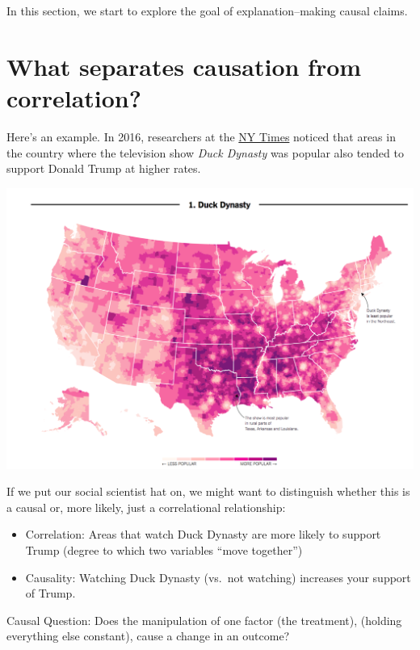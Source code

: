\documentclass[
  letterpaper,
  DIV=11,
  numbers=noendperiod]{scrreprt}
\providecommand{\tightlist}{%
  \setlength{\itemsep}{0pt}\setlength{\parskip}{0pt}}\usepackage{longtable,booktabs,array}
\begin{document}
In this section, we start to explore the goal of explanation--making
causal claims.

\hypertarget{what-separates-causation-from-correlation}{%
\section{What separates causation from
correlation?}\label{what-separates-causation-from-correlation}}

Here's an example. In 2016, researchers at the
\href{https://www.nytimes.com/interactive/2016/12/26/upshot/duck-dynasty-vs-modern-family-television-maps.html}{NY
Times} noticed that areas in the country where the television show
\emph{Duck Dynasty} was popular also tended to support Donald Trump at
higher rates.

\includegraphics{images/duckdynasty.png}

If we put our social scientist hat on, we might want to distinguish
whether this is a causal or, more likely, just a correlational
relationship:

\begin{itemize}
\tightlist
\item
  Correlation: Areas that watch Duck Dynasty are more likely to support
  Trump (degree to which two variables ``move together'')
\item
  Causality: Watching Duck Dynasty (vs.~not watching) increases your
  support of Trump.
\end{itemize}

Causal Question: Does the manipulation of one factor (the treatment),
(holding everything else constant), cause a change in an outcome?
\end{document}
